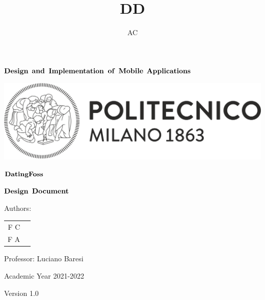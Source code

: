 \documentclass{article}
\author{AC}
\title{DD}
\begin{document}
\thispagestyle{empty} %
\begin{center}

	\vspace{3cm}

	\large $\bf Design$ $\bf and$ $\bf Implementation$ $\bf of$ $\bf Mobile$ $\bf Applications$

    \vspace{1cm}

  \includegraphics[width=\linewidth]{assets/images/polimi-logo.png}
  \vspace{2cm}
  

  \Huge $\bf DatingFoss$


	\huge $\bf Design$  $\bf Document$

	\vspace{1cm}

  Authors:
	\vspace{1cm}
	\begin{tabular}{r|l}
		 F C\\
		 F A\\
	\end{tabular}

	\vspace{1cm}

  Professor: Luciano Baresi
	
	\vspace{3cm}
  \normalsize Academic Year 2021-2022

	\vspace{2mm}
	\small Version 1.0

\end{center}

\newpage

\thispagestyle{empty} %
\tableofcontents

\newpage
  
\end{document}
